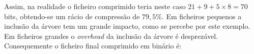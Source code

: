  Assim, na realidade o ficheiro comprimido teria neste caso $21 + 9 + 5 \times 8 = 70$ bits, obtendo-se um rácio de compressão de $79,5\%$. Em ficheiros pequenos a inclusão da árvore tem um grande impacto, como se percebe por este exemplo. Em ficheiros grandes o \textit{overhead} da inclusão da árvore é desprezável. Consequemente o ficheiro final comprimido em binário é: \\[5mm]
 \par
{} \par
\vspace{5mm}

